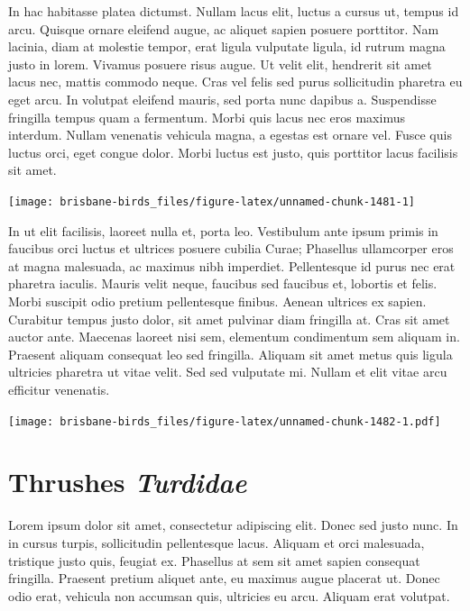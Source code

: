 \documentclass[]{book}
\let\origfigure\figure
\let\endorigfigure\endfigure
\renewenvironment{figure}[1][2] {
  \expandafter\origfigure\expandafter[H]
} {
  \endorigfigure
}
\begin{document}
In hac habitasse platea dictumst. Nullam lacus elit, luctus a cursus ut,
tempus id arcu. Quisque ornare eleifend augue, ac aliquet sapien posuere
porttitor. Nam lacinia, diam at molestie tempor, erat ligula vulputate
ligula, id rutrum magna justo in lorem. Vivamus posuere risus augue. Ut
velit elit, hendrerit sit amet lacus nec, mattis commodo neque. Cras vel
felis sed purus sollicitudin pharetra eu eget arcu. In volutpat eleifend
mauris, sed porta nunc dapibus a. Suspendisse fringilla tempus quam a
fermentum. Morbi quis lacus nec eros maximus interdum. Nullam venenatis
vehicula magna, a egestas est ornare vel. Fusce quis luctus orci, eget
congue dolor. Morbi luctus est justo, quis porttitor lacus facilisis sit
amet.

\begin{figure}
\texttt{[image: brisbane-birds\_files/figure-latex/unnamed-chunk-1481-1]} \caption{insert figure caption}\label{fig:unnamed-chunk-1481}
\end{figure}

In ut elit facilisis, laoreet nulla et, porta leo. Vestibulum ante ipsum
primis in faucibus orci luctus et ultrices posuere cubilia Curae;
Phasellus ullamcorper eros at magna malesuada, ac maximus nibh
imperdiet. Pellentesque id purus nec erat pharetra iaculis. Mauris velit
neque, faucibus sed faucibus et, lobortis et felis. Morbi suscipit odio
pretium pellentesque finibus. Aenean ultrices ex sapien. Curabitur
tempus justo dolor, sit amet pulvinar diam fringilla at. Cras sit amet
auctor ante. Maecenas laoreet nisi sem, elementum condimentum sem
aliquam in. Praesent aliquam consequat leo sed fringilla. Aliquam sit
amet metus quis ligula ultricies pharetra ut vitae velit. Sed sed
vulputate mi. Nullam et elit vitae arcu efficitur venenatis.

\begin{figure}
\centering
\texttt{[image: brisbane-birds\_files/figure-latex/unnamed-chunk-1482-1.pdf]}
\caption{\label{fig:unnamed-chunk-1482}insert figure caption}
\end{figure}

\chapter{\texorpdfstring{Thrushes
\emph{Turdidae}}{Thrushes Turdidae}}\label{thrushes-turdidae}

Lorem ipsum dolor sit amet, consectetur adipiscing elit. Donec sed justo
nunc. In in cursus turpis, sollicitudin pellentesque lacus. Aliquam et
orci malesuada, tristique justo quis, feugiat ex. Phasellus at sem sit
amet sapien consequat fringilla. Praesent pretium aliquet ante, eu
maximus augue placerat ut. Donec odio erat, vehicula non accumsan quis,
ultricies eu arcu. Aliquam erat volutpat.
\end{document}
